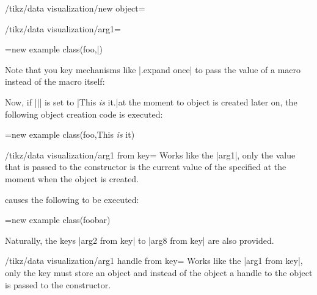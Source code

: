 \begin{key}{/tikz/data visualization/new object=}
\begin{key}{/tikz/data visualization/arg1=}
\begin{codeexample}
\pgfoonew \tikzdvobj=new example class(foo,\bar)
\end{codeexample}
        Note that you key mechanisms like |.expand once| to pass the value of a
        macro instead of the macro itself:
\begin{codeexample}
\end{codeexample}
        Now, if |\bar| is set to |This \emph{is} it.|\@ at the moment to object
        is created later on, the following object creation code is executed:
\begin{codeexample}
\pgfoonew \tikzdvobj=new example class(foo,This \emph{is} it)
\end{codeexample}
    \end{key}

    \begin{key}{/tikz/data visualization/arg1 from key=}
        Works like the |arg1|, only the value that is passed to the constructor
        is the current value of the specified  at the moment when the
        object is created.
\begin{codeexample}
\tikzset{some key/.initial=foobar}
\end{codeexample}
        causes the following to be executed:
\begin{codeexample}
\pgfoonew \tikzdvobj=new example class(foobar)
\end{codeexample}
        Naturally, the keys |arg2 from key| to |arg8 from key| are also
        provided.
    \end{key}

    \begin{key}{/tikz/data visualization/arg1 handle from key=}
        Works like the |arg1 from key|, only the key must store an object and
        instead of the object a handle to the object is passed to the
        constructor.
    \end{key}
\end{key}
